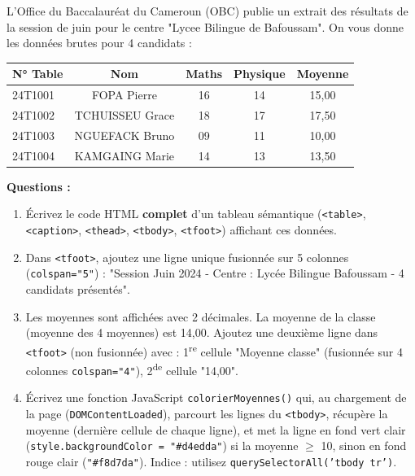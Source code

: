 \documentclass[11pt]{article}
\begin{document}
\begin{exercice}
\label{exo:bac_tableau}
L'Office du Baccalauréat du Cameroun (OBC) publie un extrait des résultats de la session de juin pour le centre "Lycee Bilingue de Bafoussam". On vous donne les données brutes pour 4 candidats :

\begin{center}
\begin{tabular}{|l|c|c|c|c|}
\hline
\textbf{N° Table} & \textbf{Nom} & \textbf{Maths} & \textbf{Physique} & \textbf{Moyenne} \\ \hline
24T1001 & FOPA Pierre & 16 & 14 & 15,00 \\ \hline
24T1002 & TCHUISSEU Grace & 18 & 17 & 17,50 \\ \hline
24T1003 & NGUEFACK Bruno & 09 & 11 & 10,00 \\ \hline
24T1004 & KAMGAING Marie & 14 & 13 & 13,50 \\ \hline
\end{tabular}
\end{center}

\textbf{Questions :}
\begin{enumerate}
    \item Écrivez le code HTML \textbf{complet} d'un tableau sémantique (\texttt{<table>}, \texttt{<caption>}, \texttt{<thead>}, \texttt{<tbody>}, \texttt{<tfoot>}) affichant ces données.
    \item Dans \texttt{<tfoot>}, ajoutez une ligne unique fusionnée sur 5 colonnes (\texttt{colspan="5"}) : "Session Juin 2024 - Centre : Lycée Bilingue Bafoussam - 4 candidats présentés".
    \item Les moyennes sont affichées avec 2 décimales. La moyenne de la classe (moyenne des 4 moyennes) est 14,00. Ajoutez une deuxième ligne dans \texttt{<tfoot>} (non fusionnée) avec : 1\textsuperscript{re} cellule "Moyenne classe" (fusionnée sur 4 colonnes \texttt{colspan="4"}), 2\textsuperscript{de} cellule "14,00".
    \item Écrivez une fonction JavaScript \texttt{colorierMoyennes()} qui, au chargement de la page (\texttt{DOMContentLoaded}), parcourt les lignes du \texttt{<tbody>}, récupère la moyenne (dernière cellule de chaque ligne), et met la ligne en fond vert clair (\texttt{style.backgroundColor = "\#d4edda"}) si la moyenne $\ge$ 10, sinon en fond rouge clair (\texttt{"\#f8d7da"}). Indice : utilisez \texttt{querySelectorAll('tbody tr')}.
\end{enumerate}
\end{exercice}
\end{document}
